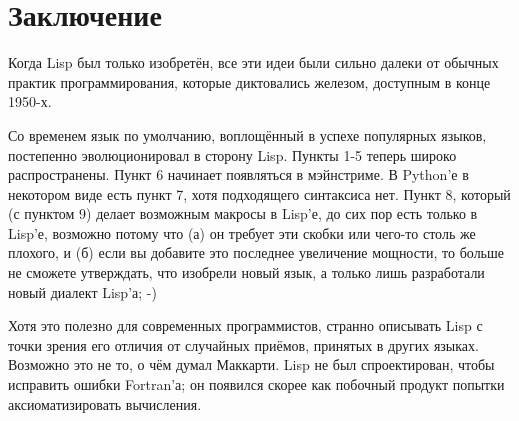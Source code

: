 \documentclass[ebook,12pt,oneside,openany]{memoir}
\begin{document}
\section*{Заключение}

Когда Lisp был только изобретён, все эти идеи были сильно далеки от
обычных практик программирования, которые диктовались железом,
доступным в конце 1950-х. \newline

Со временем язык по умолчанию, воплощённый в успехе популярных языков,
постепенно эволюционировал в сторону Lisp. Пункты 1-5 теперь широко
распространены. Пункт 6 начинает появляться в мэйнстриме. В Python'е в
некотором виде есть пункт 7, хотя подходящего синтаксиса нет. Пункт 8,
который (с пунктом 9) делает возможным макросы в Lisp'е, до сих пор
есть только в Lisp'е, возможно потому что (а) он требует эти скобки
или чего-то столь же плохого, и (б) если вы добавите это последнее
увеличение мощности, то больше не сможете утверждать, что изобрели
новый язык, а только лишь разработали новый диалект Lisp'а; -) \newline

Хотя это полезно для современных программистов, странно описывать Lisp
с точки зрения его отличия от случайных приёмов, принятых в других
языках. Возможно это не то, о чём думал Маккарти. Lisp не был
спроектирован, чтобы исправить ошибки Fortran'а; он появился скорее
как побочный продукт попытки аксиоматизировать вычисления.
\end{document}
